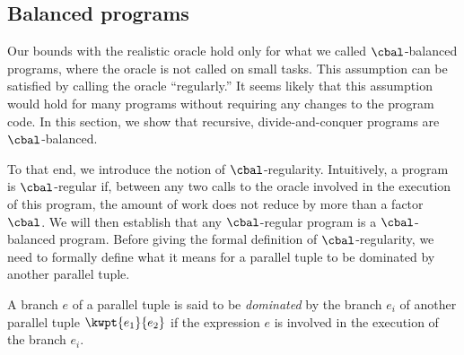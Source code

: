 \subsection{Balanced programs}
\label{sec:balanced}

Our bounds with the realistic oracle hold only for what we called
$\cbal$-balanced programs, where the oracle is not called on small
tasks.  This assumption can be satisfied by calling the oracle
``regularly.''  It seems likely that this assumption would hold for
many programs without requiring any changes to the program code.  In
this section, we show that recursive, divide-and-conquer programs are
$\cbal$-balanced.

To that end, we introduce the notion of $\cbal$-regularity.
Intuitively, a program is $\cbal$-regular if, between any two calls
to the oracle involved in the execution of this program,
the amount of work does not reduce by more than a factor $\cbal$.
We will then establish that any $\cbal$-regular program is 
a $\cbal$-balanced program.
Before giving the formal definition of $\cbal$-regularity,
we need to formally define what it means for a parallel tuple
to be dominated by another parallel tuple.

\begin{definition}
A branch $e$ of a parallel tuple is said to be {\em dominated} by the
branch $e_i$ of another parallel tuple $\kwpt{e_1}{e_2}$ if
the expression $e$ is involved in the execution of the branch $e_i$.
\end{definition}

